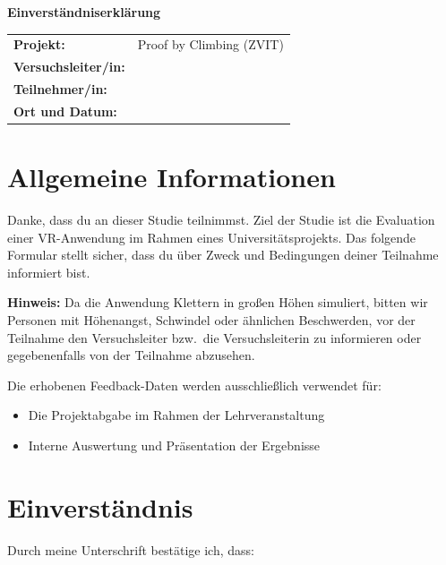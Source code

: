 \documentclass[a4paper, 12pt]{article}
\begin{document}
\begin{center}
    {\LARGE \textbf{Einverständniserklärung}}
\end{center}

\vspace{0.5cm}

\begin{tabular}{ll}
    \textbf{Projekt:}           & Proof by Climbing (ZVIT) \\
    \textbf{Versuchsleiter/in:} & \underline{\hspace{5cm}} \\
    \textbf{Teilnehmer/in:}     & \underline{\hspace{5cm}} \\
    \textbf{Ort und Datum:}     & \underline{\hspace{5cm}} \\
\end{tabular}

\vspace{1cm}

\section*{Allgemeine Informationen}

Danke, dass du an dieser Studie teilnimmst. Ziel der Studie ist die Evaluation einer VR-Anwendung im Rahmen eines Universitätsprojekts. Das folgende Formular stellt sicher, dass du über Zweck und Bedingungen deiner Teilnahme informiert bist.

\textbf{Hinweis:} Da die Anwendung Klettern in großen Höhen simuliert, bitten wir Personen mit Höhenangst, Schwindel oder ähnlichen Beschwerden, vor der Teilnahme den Versuchsleiter bzw.\ die Versuchsleiterin zu informieren oder gegebenenfalls von der Teilnahme abzusehen.

Die erhobenen Feedback-Daten werden ausschließlich verwendet für:

\begin{itemize}
    \item Die Projektabgabe im Rahmen der Lehrveranstaltung
    \item Interne Auswertung und Präsentation der Ergebnisse
\end{itemize}

\section*{Einverständnis}

Durch meine Unterschrift bestätige ich, dass:
\end{document}
